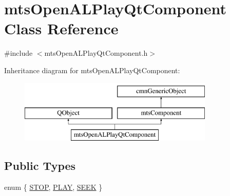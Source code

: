 \hypertarget{classmts_open_a_l_play_qt_component}{}\section{mts\+Open\+A\+L\+Play\+Qt\+Component Class Reference}
\label{classmts_open_a_l_play_qt_component}


{\ttfamily \#include $<$mts\+Open\+A\+L\+Play\+Qt\+Component.\+h$>$}

Inheritance diagram for mts\+Open\+A\+L\+Play\+Qt\+Component\+:\begin{figure}[H]
\begin{center}
\leavevmode
\includegraphics[height=3.000000cm]{d0/d37/classmts_open_a_l_play_qt_component}
\end{center}
\end{figure}
\subsection*{Public Types}
\begin{DoxyCompactItemize}
\item 
enum \{ \hyperlink{classmts_open_a_l_play_qt_component_a2e83f1e7375cc3a561439ae40f744727a4f8405fd97075c94a709704540a2a040}{S\+T\+O\+P}, 
\hyperlink{classmts_open_a_l_play_qt_component_a2e83f1e7375cc3a561439ae40f744727a54bb34d81134957005002104220ee8f3}{P\+L\+A\+Y}, 
\hyperlink{classmts_open_a_l_play_qt_component_a2e83f1e7375cc3a561439ae40f744727aca7c13ac68f726a977dc35ebd023363e}{S\+E\+E\+K}
 \}
\end{DoxyCompactItemize}
